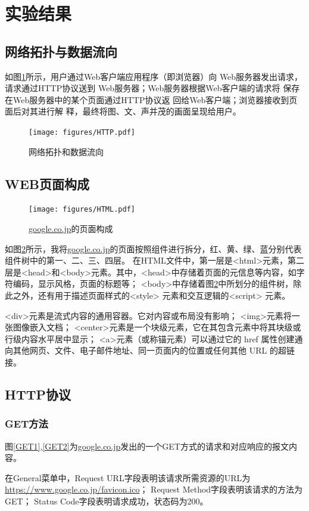 \section{实验结果}
\subsection{网络拓扑与数据流向}
如图\ref{HTTP}所示，用户通过Web客户端应用程序（即浏览器）向
Web服务器发出请求，请求通过HTTP协议送到
Web服务器；Web服务器根据Web客户端的请求将
保存在Web服务器中的某个页面通过HTTP协议返
回给Web客户端；浏览器接收到页面后对其进行解
释，最终将图、文、声并茂的画面呈现给用户。
\begin{figure}[!htbp]
    \centering
    \texttt{[image: figures/HTTP.pdf]}
    \caption{网络拓扑和数据流向}\label{HTTP}
\end{figure}
\subsection{WEB页面构成}
\begin{figure}[!htbp]
    \centering
    \texttt{[image: figures/HTML.pdf]}
    \caption{\url{google.co.jp}的页面构成}\label{HTML}
\end{figure}
如图\ref{HTML}所示，我将\url{google.co.jp}的页面按照组件进行拆分，红、黄、绿、蓝分别代表组件树中的第一、二、三、四层。
在HTML文件中，第一层是<html>元素，第二层是<head>和<body>元素。其中，<head>中存储着页面的元信息等内容，如字符编码，显示风格，页面的标题等；
<body>中存储着图\ref{HTML}中所划分的组件树，除此之外，还有用于描述页面样式的<style> 元素和交互逻辑的<script> 元素。

<div>元素是流式内容的通用容器。它对内容或布局没有影响；
<img>元素将一张图像嵌入文档；
<center>元素是一个块级元素，它在其包含元素中将其块级或行级内容水平居中显示；
<a>元素（或称锚元素）可以通过它的 href 属性创建通向其他网页、文件、电子邮件地址、同一页面内的位置或任何其他 URL 的超链接。
\subsection{HTTP协议}
\subsubsection{GET方法}
图\ref{GET1},\ref{GET2}为\url{google.co.jp}发出的一个GET方式的请求和对应响应的报文内容。

在General菜单中，Request URL字段表明该请求所需资源的URL为\url{https://www.google.co.jp/favicon.ico}；
Request Method字段表明该请求的方法为GET；
Status Code字段表明请求成功，状态码为200。

